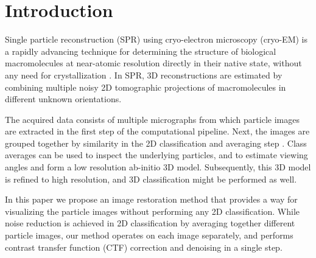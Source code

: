 \documentclass[review]{elsarticle}
\begin{document}
\linenumbers
% 
\section{Introduction}
Single particle reconstruction (SPR) using cryo-electron microscopy (cryo-EM) is 
a rapidly advancing technique for determining the structure of biological
macromolecules at near-atomic resolution directly in their native state, without any need for crystallization \cite{cryoem_rev, rev2, nogales, sigworth_rev, kuhlbrandt}. In SPR, 3D reconstructions are estimated by combining multiple noisy 2D tomographic projections
of macromolecules in different unknown orientations.

The acquired data consists of multiple micrographs from which particle images 
are extracted in the first step of the computational pipeline. Next, the images are grouped together
by similarity in the 2D classification and averaging step \cite{jane_classav,park}. Class averages can be used
to inspect the underlying particles, and
to estimate viewing angles and form a low resolution ab-initio 3D model. Subsequently, this 3D model 
is refined to high resolution, and 3D classification might be performed as well. 

In this paper we propose an image restoration method that provides a way for 
visualizing the particle images without performing any 2D classification. 
While noise reduction is achieved in 2D classification by averaging together 
different particle images, our method operates on each image separately, and 
performs contrast transfer function (CTF) correction and denoising in a single 
step. 
\end{document}

